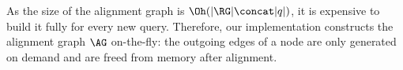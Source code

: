As the size of the alignment graph is $\Oh(\lvert \RG \rvert \concat \lvert q
\rvert)$, it is expensive to build it fully for every new query.
Therefore, our implementation constructs the alignment graph $\AG$ on-the-fly:
the outgoing edges of a node are only generated on demand and are freed from
memory after alignment.
